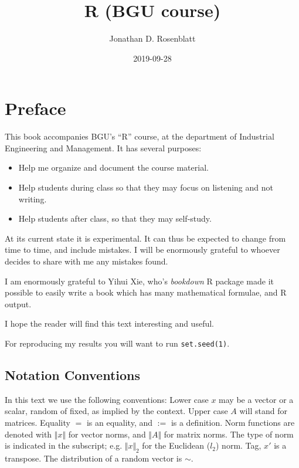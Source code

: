 \documentclass[]{book}
\title{R (BGU course)}
\author{Jonathan D. Rosenblatt}
\date{2019-09-28}
\providecommand{\tightlist}{%
  \setlength{\itemsep}{0pt}\setlength{\parskip}{0pt}}
\theoremstyle{definition}
\theoremstyle{definition}
\theoremstyle{definition}
\theoremstyle{remark}
\begin{document}
\maketitle

{
\setcounter{tocdepth}{1}
\tableofcontents
}
\hypertarget{preface}{%
\chapter{Preface}\label{preface}}

This book accompanies BGU's ``R'' course, at the department of Industrial Engineering and Management.
It has several purposes:

\begin{itemize}
\tightlist
\item
  Help me organize and document the course material.
\item
  Help students during class so that they may focus on listening and not writing.
\item
  Help students after class, so that they may self-study.
\end{itemize}

At its current state it is experimental.
It can thus be expected to change from time to time, and include mistakes.
I will be enormously grateful to whoever decides to share with me any mistakes found.

I am enormously grateful to Yihui Xie, who's \emph{bookdown} R package made it possible to easily write a book which has many mathematical formulae, and R output.

I hope the reader will find this text interesting and useful.

For reproducing my results you will want to run \texttt{set.seed(1)}.

\hypertarget{notation-conventions}{%
\section{Notation Conventions}\label{notation-conventions}}

In this text we use the following conventions:
Lower case \(x\) may be a vector or a scalar, random of fixed, as implied by the context.
Upper case \(A\) will stand for matrices.
Equality \(=\) is an equality, and \(:=\) is a definition.
Norm functions are denoted with \(\Vert x \Vert\) for vector norms, and \(\Vert A \Vert\) for matrix norms.
The type of norm is indicated in the subscript; e.g. \(\Vert x \Vert_2\) for the Euclidean (\(l_2\)) norm.
Tag, \(x'\) is a transpose.
The distribution of a random vector is \(\sim\).
\end{document}

